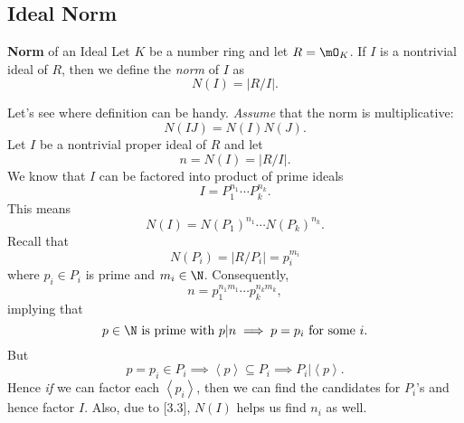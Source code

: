 \documentclass[pmath441]{subfiles}
\begin{document}
    \subsection{Ideal Norm}
    
    \begin{definition}{\textbf{Norm} of an Ideal}
        Let $K$ be a number ring and let $R=\mO_K$. If $I$ is a nontrivial ideal of $R$, then we define the \emph{norm} of $I$ as
        \begin{equation*}
            N\left( I \right) = \left| R /I \right|.
        \end{equation*}
    \end{definition}
    
    \np Let's see where definition can be handy. \textit{Assume} that the norm is multiplicative:
    \begin{equation*}
        N\left( IJ \right) = N\left( I \right)N\left( J \right).
    \end{equation*}
    Let $I$ be a nontrivial proper ideal of $R$ and let
    \begin{equation*}
        n = N\left( I \right) = \left| R /I \right|.
    \end{equation*}
    We know that $I$ can be factored into product of prime ideals
    \begin{equation*}
        I = P_1^{n_1}\cdots P_k^{n_k}.
    \end{equation*}
    This means
    \begin{equation}
        N\left( I \right) = N\left( P_1 \right)^{n_1}\cdots N\left( P_k \right)^{n_k}.
    \end{equation}
    Recall that
    \begin{equation*}
        N\left( P_i \right) = \left| R /P_i \right| = p_i^{m_i}
    \end{equation*}
    where $p_i\in P_i$ is prime and $m_i\in\N$. Consequently,
    \begin{equation*}
        n = p_1^{n_1m_1}\cdots p_k^{n_km_k},
    \end{equation*}
    implying that
    \begin{equation*}
        p\in\N\text{ is prime with }p|n \implies p = p_i\text{ for some $i$}.
    \end{equation*}
    But
    \begin{equation*}
        p = p_i\in P_i \implies \left< p \right>\subseteq P_i \implies P_i|\left< p \right>.  
    \end{equation*}
    Hence \textit{if} we can factor each $\left< p_i \right>$, then we can find the candidates for $P_i$'s and hence factor $I$. Also, due to [3.3], $N\left( I \right)$ helps us find $n_i$ as well.
\end{document}
